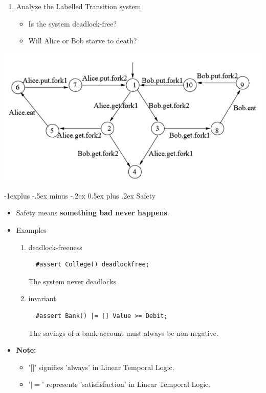 \documentclass[10pt, landscape]{article}
\makeatletter
\renewcommand{\subsection}{\@startsection{subsection}{2}{0mm}%
  {-1explus -.5ex minus -.2ex}%
  {0.5ex plus .2ex}%
{\normalfont\normalsize\bfseries}}
\makeatother
\begin{document}
\begin{multicols*}{3}
\begin{enumerate}
\begin{itemize}
      \end{itemize}
      \item Analyze the Labelled Transition system
      \begin{itemize}
          \item Is the system deadlock-free?
          \item Will Alice or Bob starve to death?
      \end{itemize}
  \end{enumerate}
  \begin{center}
    \includegraphics[scale=0.2]{./images/DiningPhilosophers.png}   
  \end{center}


  \subsection{Safety}
  \begin{itemize}
  \item Safety means \textbf{something bad never happens}.
  \item Examples
  \begin{enumerate}
  \item deadlock-freeness
  \begin{lstlisting}
  #assert College() deadlockfree;
  \end{lstlisting}
  The system never deadlocks
  \item invariant
  \begin{lstlisting}
  #assert Bank() |= [] Value >= Debit;
  \end{lstlisting}
  The savings of a bank account must always be non-negative.
  \end{enumerate}
  \item \textbf{Note:}
  \begin{itemize}
    \item '[]' signifies 'always' in Linear Temporal Logic.
    \item '$\mid =$' represents 'satisfisfaction' in Linear Temporal Logic.
  \end{itemize}
  \end{itemize}


\end{multicols*}
\end{document}
